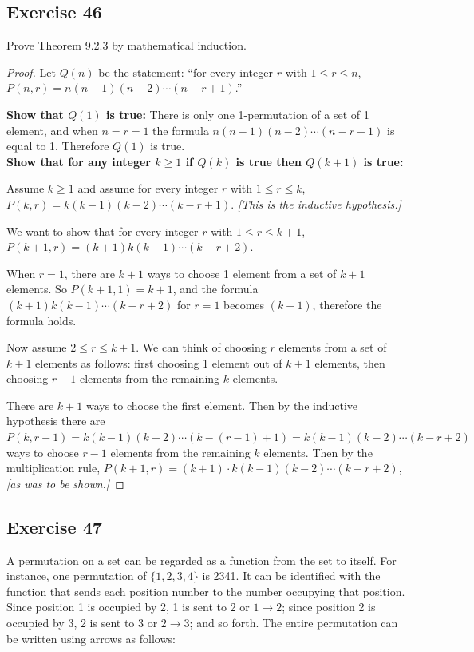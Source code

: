 \documentclass[14pt]{extarticle}
\begin{document}
\subsection{Exercise 46}
Prove Theorem 9.2.3 by mathematical induction.

\begin{proof}
     Let \(Q(n)\) be the statement: ``for every integer $r$ with \(1 \leq r \leq n\),
     \(P(n,r) = n(n - 1)(n - 2) \cdots (n - r + 1)\).''

     {\bf Show that \(Q(1)\) is true:} There is only one 1-permutation of a set of 1 element, and when \(n=r=1\)
     the formula \(n(n - 1)(n - 2) \cdots (n - r + 1)\) is equal to 1. Therefore \(Q(1)\) is true. \\
     {\bf Show that for any integer \(k \geq 1\) if \(Q(k)\) is true then \(Q(k+1)\) is true:}

     Assume \(k \geq 1\) and assume for every integer $r$ with \(1 \leq r \leq k\), \(P(k,r) = k(k - 1)(k - 2) \cdots (k-r+1)\).
          {\it [This is the inductive hypothesis.]}

     We want to show that for every integer $r$ with \(1 \leq r \leq k+1\), \(P(k+1,r) = (k+1)k(k-1) \cdots (k-r + 2)\).

     When \(r = 1\), there are $k+1$ ways to choose 1 element from a set of $k+1$ elements. So \(P(k+1,1) = k+1\), and
     the formula \((k+1)k(k-1) \cdots (k-r + 2)\) for \(r = 1\) becomes \((k+1)\), therefore the formula holds.

     Now assume \(2 \leq r \leq k+1\). We can think of choosing $r$ elements from a set of $k+1$ elements as follows: first
     choosing 1 element out of $k+1$ elements, then choosing $r-1$ elements from the remaining $k$ elements.

     There are $k+1$ ways to choose the first element. Then by the inductive hypothesis there are \(P(k, r-1) = k(k - 1)
     (k - 2) \cdots (k - (r-1) + 1) = k(k - 1)(k - 2) \cdots (k - r + 2)\) ways to choose $r-1$ elements from the remaining
     $k$ elements. Then by the multiplication rule, \(P(k+1,r) = (k+1) \cdot k(k - 1)(k - 2) \cdots (k - r + 2)\),
     {\it [as was to be shown.]}
\end{proof}

\subsection{Exercise 47}
A permutation on a set can be regarded as a function from the set to itself. For instance, one permutation of
\(\{1, 2, 3, 4\}\) is 2341. It can be identified with the function that sends each position number to the number
occupying that position. Since position 1 is occupied by 2, 1 is sent to 2 or \(1 \to 2\); since position 2 is occupied
by 3, 2 is sent to 3 or \(2 \to 3\); and so forth. The entire permutation can be written using arrows as follows:
\end{document}
